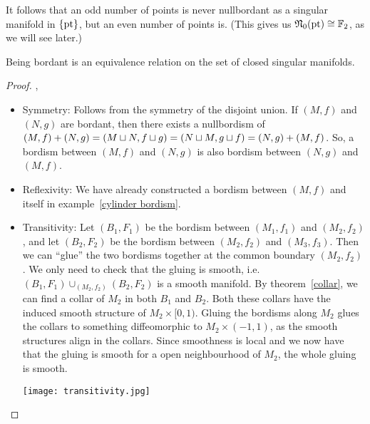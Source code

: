 \documentclass[a4paper,11pt]{article}
\begin{document}
\begin{remark}
     It follows that an odd number of points is never nullbordant as a singular manifold in \(\{\mathrm{pt}\}\), but an even number of points is. (This gives us \(\mathfrak{N}_0(\mathrm{pt})\cong\mathbb{F}_2\), as we will see later.)
\end{remark}


\begin{proposition}\cite[II, Satz 1.4]{brocker}\label{equivalence bordant}
    Being bordant is an equivalence relation on the set of closed singular manifolds.
\end{proposition}

\begin{proof}\cite{brocker},\ \cite[p.8]{conner}
    \begin{itemize}
        \item Symmetry: 
        Follows from the symmetry of the disjoint union. 
        If \((M,f)\) and \((N,g)\) are bordant, then there exists a nullbordism of \((M,f)+(N,g)=(M\sqcup N, f\sqcup g) = (N\sqcup M, g\sqcup f) = (N,g)+ (M,f)\). 
        So, a bordism between \((M,f)\) and \((N,g)\) is also bordism between \((N,g)\) and \((M,f)\).

        \item Reflexivity: 
        We have already constructed a bordism between \((M,f)\) and itself in example\ \ref{cylinder bordism}.

        \item Transitivity: 
        Let \((B_1,F_1)\) be the bordism between \((M_1,f_1)\) and \((M_2,f_2)\), and let \((B_2,F_2)\) be the bordism between \((M_2,f_2)\) and \((M_3,f_3)\). Then we can \enquote{glue} the two bordisms together at the common boundary \((M_2,f_2)\). 
        We only need to check that the gluing is smooth, i.e.\ \((B_1,F_1)\cup_{(M_2,f_2)}(B_2,F_2)\) is a smooth manifold. 
        By theorem\ \ref{collar}, we can find a collar of \(M_2\) in both \(B_1\) and \(B_2\). 
        Both these collars have the induced smooth structure of \(M_2\times [0,1)\). 
        Gluing the bordisms along \(M_2\) glues the collars to something diffeomorphic to \(M_2\times (-1,1)\), as the smooth structures align in the collars. 
        Since smoothness is local and we now have that the gluing is smooth for a open neighbourhood of \(M_2\), the whole gluing is smooth.
        \begin{center}
            \texttt{[image: transitivity.jpg]}
        \end{center}
    \end{itemize}
\end{proof}
\end{document}
